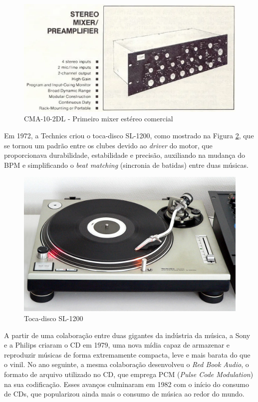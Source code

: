 \begin{figure}[h]
	\centering
    \includegraphics[scale=0.6]{figuras/fig10.eps}
	\caption{CMA-10-2DL - Primeiro mixer estéreo comercial \cite{electronicaptBozak102}}
	\label{fig10}
\end{figure}

Em 1972, a Technics criou o toca-disco SL-1200, como mostrado na Figura \ref{fig14}, que se tornou um padrão entre os clubes devido ao \textit{driver} do motor, que proporcionava durabilidade, estabilidade e precisão, auxiliando na mudança do BPM e simplificando o \textit{beat matching} (sincronia de batidas) entre duas músicas.

\begin{figure}[h]
	\centering
    \includegraphics[scale=0.25]{figuras/fig14.png}
	\caption{Toca-disco SL-1200 \cite{wikimediaFileTechnicsSL1200MK22jpg}}
	\label{fig14}
\end{figure}

A partir de uma colaboração entre duas gigantes da indústria da música, a Sony e a Philips criaram o CD em 1979, uma nova mídia capaz de armazenar e reproduzir músicas de forma extremamente compacta, leve e mais barata do que o vinil. No ano seguinte, a mesma colaboração desenvolveu o \textit{Red Book Audio}, o formato de arquivo utilizado no CD, que emprega PCM (\textit{Pulse Code Modulation}) na sua codificação. Esses avanços culminaram em 1982 com o início do consumo de CDs, que popularizou ainda mais o consumo de música ao redor do mundo.

